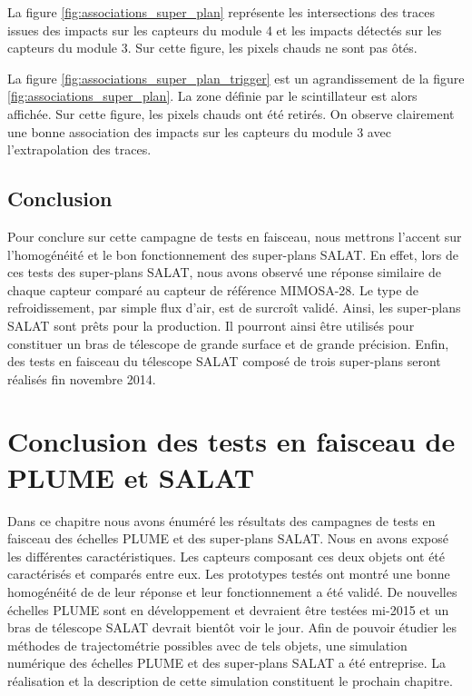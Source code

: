   \medskip
  
  La figure \ref{fig:associations_super_plan} repr\'esente les intersections des traces issues des impacts sur les capteurs du module 4 et les impacts d\'etect\'es sur les capteurs du module 3. Sur cette figure, les pixels chauds ne sont pas \^otés. 

  \medskip
  
   La figure \ref{fig:associations_super_plan_trigger} est un agrandissement de la figure \ref{fig:associations_super_plan}. La zone d\'efinie par le scintillateur est alors affich\'ee. Sur cette figure, les pixels chauds ont \'et\'e retir\'es. On observe clairement une bonne association des impacts sur les capteurs du module 3 avec l'extrapolation des traces.
  
  \FloatBarrier
  
  \subsection{Conclusion}
  
  Pour conclure sur cette campagne de tests en faisceau, nous mettrons l'accent sur l'homog\'en\'eit\'e et le bon fonctionnement des super-plans SALAT. En effet, lors de ces tests des super-plans SALAT, nous avons observ\'e une r\'eponse similaire de chaque capteur compar\'e au capteur de r\'ef\'erence MIMOSA-28. Le type de refroidissement, par simple flux d'air, est de surcro\^it valid\'e. Ainsi, les super-plans SALAT sont prêts pour la production. Il pourront ainsi \^etre utilis\'es pour constituer un bras de t\'elescope de grande surface et de grande pr\'ecision. Enfin, des tests en faisceau du t\'elescope SALAT compos\'e de trois super-plans seront r\'ealis\'es fin novembre 2014.
  
\section{Conclusion des tests en faisceau de PLUME et SALAT}

 Dans ce chapitre nous avons \'enum\'er\'e les r\'esultats des campagnes de tests en faisceau des \'echelles PLUME et des super-plans SALAT. Nous en avons expos\'e les diff\'erentes caract\'eristiques. Les capteurs composant ces deux objets ont \'et\'e caract\'eris\'es et compar\'es entre eux. Les prototypes test\'es ont montr\'e une bonne homog\'en\'eit\'e de de leur r\'eponse et leur fonctionnement a \'et\'e valid\'e. De nouvelles \'echelles PLUME sont en d\'eveloppement et devraient être test\'ees mi-2015 et un bras de t\'elescope SALAT devrait bientôt voir le jour. Afin de pouvoir \'etudier les m\'ethodes de trajectom\'etrie possibles avec de tels objets, une simulation num\'erique des \'echelles PLUME et des super-plans SALAT a \'et\'e entreprise. La r\'ealisation et la description de cette simulation constituent le prochain chapitre.